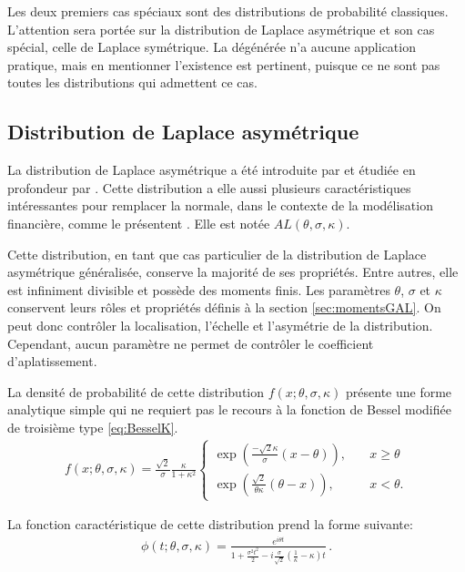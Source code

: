 Les deux premiers cas spéciaux sont des distributions de probabilité
classiques. L’attention sera portée sur la distribution de Laplace
asymétrique et son cas spécial, celle de Laplace symétrique. La
dégénérée n'a aucune application pratique, mais en mentionner
l'existence est pertinent, puisque ce ne sont pas toutes les
distributions qui admettent ce cas.

\subsection{Distribution de Laplace asymétrique}
\label{sec:distributionAL}

La distribution de Laplace asymétrique a été introduite
par \cite{hinkley1977estimation} et étudiée en profondeur par
\cite{kozubowski1999class}.  Cette distribution a elle aussi plusieurs
caractéristiques intéressantes pour remplacer la normale, dans le
contexte de la modélisation financière, comme le présentent
\cite{kozubowski2001asymmetric}. Elle est notée
$AL(\theta,\sigma,\kappa)$.

Cette distribution, en tant que cas particulier de la distribution de
Laplace asymétrique généralisée, conserve la majorité de ses
propriétés.  Entre autres, elle est infiniment divisible et possède des moments
finis. Les paramètres $\theta$, $\sigma$ et $\kappa$ conservent leurs
rôles et propriétés définis à la section \ref{sec:momentsGAL}. On peut
donc contrôler la localisation, l'échelle et l'asymétrie de la
distribution. Cependant, aucun paramètre ne permet de contrôler le
coefficient d'aplatissement.

La densité de probabilité de cette distribution
$f(x;\theta,\sigma,\kappa)$ présente une forme analytique simple qui
ne requiert pas le recours à la fonction de Bessel modifiée de
troisième type \eqref{eq:BesselK}.
\begin{align}
  \label{eq:densiteAL}
  f(x;\theta,\sigma,\kappa) =
  \frac{\sqrt{2}}{\sigma}\frac{\kappa}{1+\kappa^2} \begin{cases}
    \exp\left(\frac{-\sqrt{2}\kappa}{\sigma}\left( x-\theta \right)\right),\quad & x\geq\theta \\
    \exp\left( \frac{\sqrt{2}}{\theta\kappa}\left(\theta - x \right)
    \right),\quad & x<\theta.\end{cases}
\end{align}

La fonction caractéristique de cette distribution prend la forme
suivante:
\begin{align}
  \label{eq:caractALkappa}
  \phi(t;\theta,\sigma,\kappa) = \frac{e^{i \theta
      t}}{1+\frac{\sigma^2 t^2}{2}-
    i\frac{\sigma}{\sqrt{2}}\left(\frac{1}{\kappa}-\kappa \right)
    t}\,.
\end{align}


